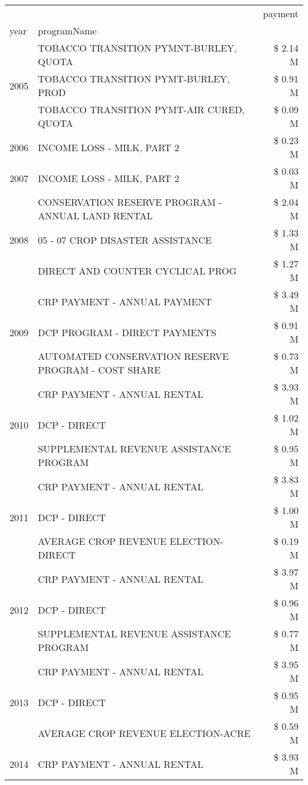 \begin{tabular}{llr}
\toprule
 &  & payment \\
year & programName &  \\
\midrule
\multirow[t]{3}{*}{2005} & TOBACCO TRANSITION PYMNT-BURLEY, QUOTA & \$ 2.14 M \\
 & TOBACCO TRANSITION PYMT-BURLEY, PROD & \$ 0.91 M \\
 & TOBACCO TRANSITION PYMT-AIR CURED, QUOTA & \$ 0.09 M \\
\cline{1-3}
2006 & INCOME LOSS - MILK, PART 2 & \$ 0.23 M \\
\cline{1-3}
2007 & INCOME LOSS - MILK, PART 2 & \$ 0.03 M \\
\cline{1-3}
\multirow[t]{3}{*}{2008} & CONSERVATION RESERVE PROGRAM - ANNUAL LAND RENTAL & \$ 2.04 M \\
 & 05 - 07 CROP DISASTER ASSISTANCE & \$ 1.33 M \\
 & DIRECT AND COUNTER CYCLICAL PROG & \$ 1.27 M \\
\cline{1-3}
\multirow[t]{3}{*}{2009} & CRP PAYMENT - ANNUAL PAYMENT & \$ 3.49 M \\
 & DCP PROGRAM - DIRECT PAYMENTS & \$ 0.91 M \\
 & AUTOMATED CONSERVATION RESERVE PROGRAM - COST SHARE & \$ 0.73 M \\
\cline{1-3}
\multirow[t]{3}{*}{2010} & CRP PAYMENT - ANNUAL RENTAL & \$ 3.93 M \\
 & DCP - DIRECT & \$ 1.02 M \\
 & SUPPLEMENTAL REVENUE ASSISTANCE PROGRAM & \$ 0.95 M \\
\cline{1-3}
\multirow[t]{3}{*}{2011} & CRP PAYMENT - ANNUAL RENTAL & \$ 3.83 M \\
 & DCP - DIRECT & \$ 1.00 M \\
 & AVERAGE CROP REVENUE ELECTION-DIRECT & \$ 0.19 M \\
\cline{1-3}
\multirow[t]{3}{*}{2012} & CRP PAYMENT - ANNUAL RENTAL & \$ 3.97 M \\
 & DCP - DIRECT & \$ 0.96 M \\
 & SUPPLEMENTAL REVENUE ASSISTANCE PROGRAM & \$ 0.77 M \\
\cline{1-3}
\multirow[t]{3}{*}{2013} & CRP PAYMENT - ANNUAL RENTAL & \$ 3.95 M \\
 & DCP - DIRECT & \$ 0.95 M \\
 & AVERAGE CROP REVENUE ELECTION-ACRE & \$ 0.59 M \\
\cline{1-3}
\multirow[t]{3}{*}{2014} & CRP PAYMENT - ANNUAL RENTAL & \$ 3.93 M \\

\end{tabular}

